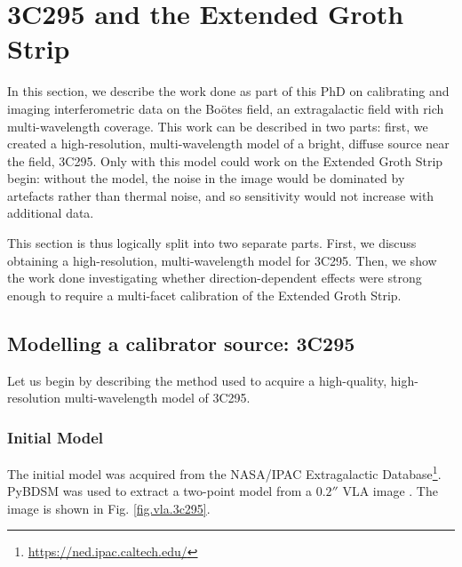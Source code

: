 
\section{3C295 and the Extended Groth Strip}\label{section.3c295+EGS}
\pg
In this section, we describe the work done as part of this PhD on calibrating and imaging interferometric data on the Boötes field, an extragalactic field with rich multi-wavelength coverage. This work can be described in two parts: first, we created a high-resolution, multi-wavelength model of a bright, diffuse source near the field, 3C295. Only with this model could work on the Extended Groth Strip begin: without the model, the noise in the image would be dominated by artefacts rather than thermal noise, and so sensitivity would not increase with additional data. 

\pg
This section is thus logically split into two separate parts. First, we discuss obtaining a high-resolution, multi-wavelength model for 3C295. Then, we show the work done investigating whether direction-dependent effects were strong enough to require a multi-facet calibration of the Extended Groth Strip.


\subsection{Modelling a calibrator source: 3C295}\label{section.3c295}

\pg
Let us begin by describing the method used to acquire a high-quality, high-resolution multi-wavelength model of 3C295. 

\subsubsection{Initial Model}
\pg
The initial model was acquired from the NASA/IPAC Extragalactic Database\footnote{\hyperref[here]{https://ned.ipac.caltech.edu/}}. PyBDSM \citep{2015ascl.soft02007M} was used to extract a two-point model from a $0.2''$ VLA image \citep[see][]{1991AJ....101.1623P}. The image is shown in Fig. \ref{fig.vla.3c295}.

